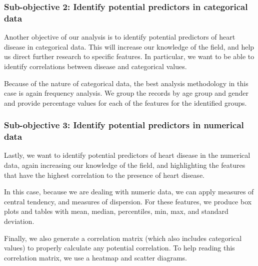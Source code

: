 \subsubsection{Sub-objective 2: Identify potential predictors in categorical data}

Another objective of our analysis is to identify potential predictors of heart disease in categorical data. This will
increase our knowledge of the field, and help us direct further research to specific features. In particular, we want
to be able to identify correlations between disease and categorical values.

Because of the nature of categorical data, the best analysis methodology in this case is again frequency analysis.
We group the records by age group and gender and provide percentage values for each of the features for the
identified groups.

\subsubsection{Sub-objective 3: Identify potential predictors in numerical data}

Lastly, we want to identify potential predictors of heart disease in the numerical data, again increasing our
knowledge of the field, and highlighting the features that have the highest correlation to the presence of
heart disease.

In this case, because we are dealing with numeric data, we can apply measures of central tendency, and measures
of dispersion. For these features, we produce box plots and tables with mean, median, percentiles, min, max, and
standard deviation.

Finally, we also generate a correlation matrix (which also includes categorical values) to properly calculate
any potential correlation. To help reading this correlation matrix, we use a heatmap and scatter diagrams.

